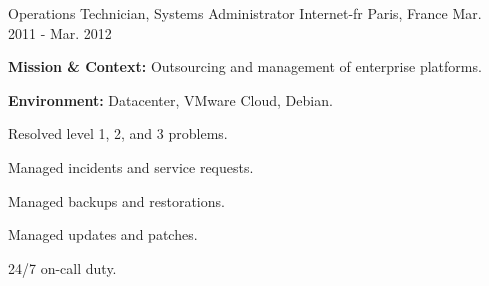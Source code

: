 \begin{cventries}
\cventry
{Operations Technician, Systems Administrator} %
{Internet-fr} %
{Paris, France} %
{Mar. 2011 - Mar. 2012} %
{
  \begin{cvitems} %
    \item {\textbf{Mission \& Context:} Outsourcing and management of enterprise platforms.}
    \item {\textbf{Environment:} Datacenter, VMware Cloud, Debian.}
    \item {Resolved level 1, 2, and 3 problems.}
    \item {Managed incidents and service requests.}
    \item {Managed backups and restorations.}
    \item {Managed updates and patches.}
    \item {24/7 on-call duty.}
  \end{cvitems}
}

\end{cventries}
